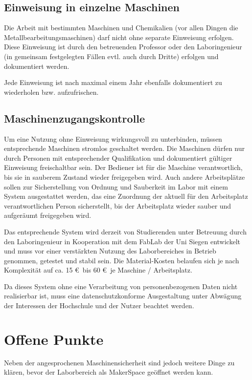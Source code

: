 \documentclass[parskip=half,headsepline,footsepline,titlepage]{scrartcl}
\begin{document}
\subsection{Einweisung in einzelne Maschinen}
Die Arbeit mit bestimmten Maschinen und Chemikalien (vor allen Dingen die Metallbearbeitungsmaschinen) darf nicht ohne separate Einweisung erfolgen. Diese Einweisung ist durch den betreuenden Professor oder den Laboringenieur (in gemeinsam festgelegten Fällen evtl. auch durch Dritte) erfolgen und dokumentiert werden. 

Jede Einweisung ist nach maximal einem Jahr ebenfalls dokumentiert zu wiederholen bzw. aufzufrischen.

\subsection{Maschinenzugangskontrolle}
Um eine Nutzung ohne Einweisung wirkungsvoll zu unterbinden, müssen entsprechende Maschinen stromlos geschaltet werden. Die Maschinen dürfen nur durch Personen mit entsprechender Qualifikation und dokumentiert gültiger Einweisung freischaltbar sein.
Der Bediener ist für die Maschine verantwortlich, bis sie in sauberem Zustand wieder freigegeben wird. Auch andere Arbeitsplätze sollen zur Sicherstellung von Ordnung und Sauberkeit im Labor mit einem System ausgestattet werden, das eine Zuordnung der aktuell für den Arbeitsplatz verantwortlichen Person sicherstellt, bis der Arbeitsplatz wieder sauber und aufgeräumt freigegeben wird.

Das entsprechende System wird derzeit von Studierenden unter Betreuung durch den Laboringenieur in Kooperation mit dem FabLab der Uni Siegen entwickelt und muss vor einer verstärkten Nutzung des Laborbereiches in Betrieb genommen, getestet und stabil sein.
Die Material-Kosten belaufen sich je nach Komplexität auf ca. 15 \euro\ bis 60 \euro\ je Maschine / Arbeitsplatz.

Da dieses System ohne eine Verarbeitung von personenbezogenen Daten nicht realisierbar ist, muss eine datenschutzkonforme Ausgestaltung unter Abwägung der Interessen der Hochschule und der Nutzer beachtet werden.


\section{Offene Punkte}
Neben der angesprochenen Maschinensicherheit sind jedoch weitere Dinge zu klären, bevor der Laborbereich als MakerSpace geöffnet werden kann. 
\end{document}
